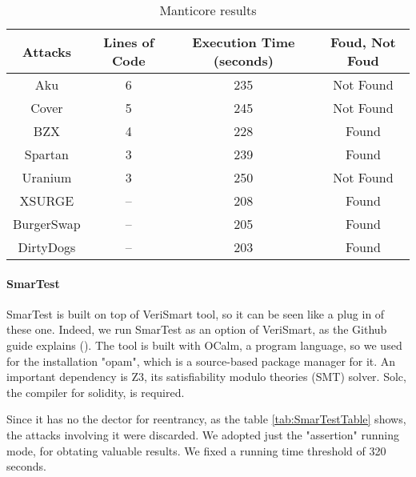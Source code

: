 \begin{center}
\begin{table*}
    \caption{Manticore results}
        \label{tab:ManticoreTable}
        \begin{tabular}{cccc}
        \toprule
            Attacks & Lines of Code & Execution Time (seconds) & Foud, Not Foud\\
            \midrule
            Aku & 6 & 235  & Not Found \\ 
            Cover & 5 & 245 & Not Found \\ 
            BZX  & 4 & 228 & Found \\ 
            Spartan & 3 & 239 & Found \\ 
            Uranium  & 3 & 250 & Not Found \\ 
            XSURGE & -- & 208 & Found \\ 
            BurgerSwap  &  -- & 205 & Found\\ 
            DirtyDogs & -- & 203 & Found \\
        \bottomrule
    \end{tabular}
\end{table*}
\end{center}

\paragraph{SmarTest} SmarTest is built on top of VeriSmart tool, so it can be seen like a plug in of these one. Indeed, we run SmarTest as an option of VeriSmart, 
as the Github guide explains (\cite{SmarTestGitHub}). The tool is built with OCalm, a program language, so we used for the installation "opam", which is a source-based package manager for it.
An important dependency is Z3, its satisfiability modulo theories (SMT) solver. Solc, the compiler for solidity, is required.

Since it has no the dector for reentrancy, as the table \autoref{tab:SmarTestTable} shows, the attacks involving it were discarded. 
We adopted just the "assertion" running mode, for obtating valuable results. 
We fixed a running time threshold of 320 seconds.

